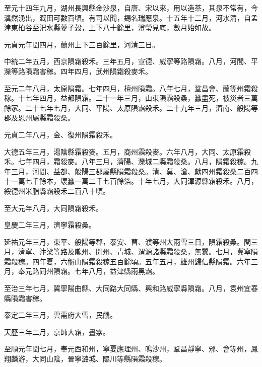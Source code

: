 \begin{pinyinscope}
 至元十四年九月，湖州長興縣金沙泉，自唐、宋以來，用以造茶，其泉不常有，今瀵然湧出，溉田可數百頃。有司以聞，錫名瑞應泉。十五年十二月，河水清，自孟津東柏谷至汜水縣蓼子穀，上下八十餘里，澄瑩見底，數月始如故。



 元貞元年閏四月，蘭州上下三百餘里，河清三日。



 中統二年五月，西京隕霜殺禾。三年五月，宣德、威寧等路隕霜。八月，河間、平灤等路隕霜害稼。四年四月，武州隕霜殺麥禾。



 至元二年八月，太原隕霜。七年四月，檀州隕霜。八年七月，鞏昌會、蘭等州霜殺稼。十七年四月，益都隕霜。二十一年三月，山東隕霜殺桑，蠶盡死，被災者三萬餘家。二十七年七月，大同、平陽、太原隕霜殺禾。二十九年三月，濟南、般陽等郡及恩州屬縣霜殺桑。



 元貞二年八月，金、復州隕霜殺禾。



 大德五年三月，湯陰縣霜殺麥。五月，商州霜殺麥。六年八月，大同、太原霜殺禾。七年四月，霜殺麥。八年三月，濟陽、灤城二縣霜殺桑。八月，隕霜殺稼。九年三月，河間、益都、般陽三郡屬縣隕霜殺桑。清、莫、滄、獻四州霜殺桑二百四十一萬七千餘本，壞蠶一萬二千七百餘箔。十年七月，大同渾源縣霜殺禾。八月，綏德州米脂縣霜殺禾二百八十頃。



 至大元年八月，大同隕霜殺禾。



 皇慶二年三月，濟寧霜殺桑。



 延祐元年三月，東平、般陽等郡，泰安、曹、濮等州大雨雪三日，隕霜殺桑。閏三月，濟寧、汴梁等路及隴州、開州、青城、渭源諸縣霜殺桑，無蠶。七月，冀寧隕霜殺稼。四年夏，六盤山隕霜殺稼五百餘頃。五年五月，雄州歸信縣隕霜。六年三月，奉元路同州隕霜。七年八月，益津縣雨黑霜。



 至治三年七月，冀寧陽曲縣、大同路大同縣、興和路威寧縣隕霜。八月，袁州宜春縣隕霜害稼。



 泰定二年三月，雲需府大雪，民饑。



 天歷三年二月，京師大霜，晝雺。



 至順元年閏七月，奉元西和州，寧夏應理州、鳴沙州，鞏昌靜寧、邠、會等州，鳳翔麟游，大同山陰，晉寧潞城、隰川等縣隕霜殺稼。




\end{pinyinscope}
